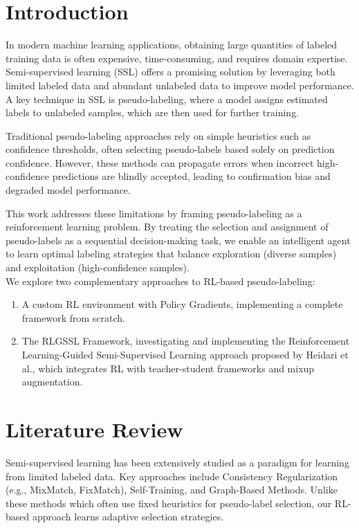 \documentclass[pdflatex,sn-mathphys-num]{sn-jnl}%
\theoremstyle{thmstyleone}%
\theoremstyle{thmstyletwo}%
\theoremstyle{thmstylethree}%
\begin{document}
\section{Introduction}\label{sec1}

In modern machine learning applications, obtaining large quantities of labeled training data is often expensive, time-consuming, and requires domain expertise. Semi-supervised learning (SSL) offers a promising solution by leveraging both limited labeled data and abundant unlabeled data to improve model performance. A key technique in SSL is pseudo-labeling, where a model assigns estimated labels to unlabeled samples, which are then used for further training.

Traditional pseudo-labeling approaches rely on simple heuristics such as confidence thresholds, often selecting pseudo-labels based solely on prediction confidence. However, these methods can propagate errors when incorrect high-confidence predictions are blindly accepted, leading to confirmation bias \cite{arazo2020pseudolabelingconfirmationbiasdeep} and degraded model performance.

This work addresses these limitations by framing pseudo-labeling as a reinforcement learning problem. By treating the selection and assignment of pseudo-labels as a sequential decision-making task, we enable an intelligent agent to learn optimal labeling strategies that balance exploration (diverse samples) and exploitation (high-confidence samples).\\

We explore two complementary approaches to RL-based pseudo-labeling:
\begin{enumerate}
    \item A custom RL environment with Policy Gradients, implementing a complete framework from scratch.\\
    \item The RLGSSL Framework, investigating and implementing the Reinforcement Learning-Guided Semi-Supervised Learning approach proposed by Heidari et al., which integrates RL with teacher-student frameworks and mixup augmentation.
\end{enumerate}

\section{Literature Review}\label{sec:lit_review}

Semi-supervised learning has been extensively studied as a paradigm for learning from limited labeled data. Key approaches include Consistency Regularization (e.g., MixMatch, FixMatch), Self-Training, and Graph-Based Methods. Unlike these methods which often use fixed heuristics for pseudo-label selection, our RL-based approach learns adaptive selection strategies.
\end{document}
